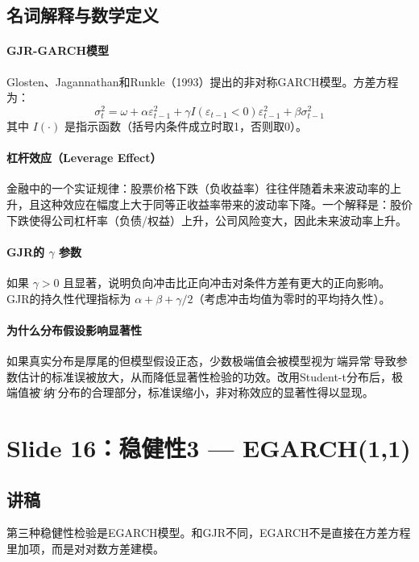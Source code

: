 \documentclass[11pt,a4paper]{article}
\begin{document}
\subsection*{名词解释与数学定义}

\paragraph{GJR-GARCH模型} Glosten、Jagannathan和Runkle（1993）提出的非对称GARCH模型。方差方程为：
\[
\sigma_t^2 = \omega + \alpha \varepsilon_{t-1}^2 + \gamma I(\varepsilon_{t-1} < 0) \varepsilon_{t-1}^2 + \beta \sigma_{t-1}^2
\]
其中 \(I(\cdot)\) 是指示函数（括号内条件成立时取1，否则取0）。

\paragraph{杠杆效应（Leverage Effect）} 金融中的一个实证规律：股票价格下跌（负收益率）往往伴随着未来波动率的上升，且这种效应在幅度上大于同等正收益率带来的波动率下降。一个解释是：股价下跌使得公司杠杆率（负债/权益）上升，公司风险变大，因此未来波动率上升。

\paragraph{GJR的 \(\gamma\) 参数} 如果 \(\gamma > 0\) 且显著，说明负向冲击比正向冲击对条件方差有更大的正向影响。GJR的持久性代理指标为 \(\alpha + \beta + \gamma/2\)（考虑冲击均值为零时的平均持久性）。

\paragraph{为什么分布假设影响显著性} 如果真实分布是厚尾的但模型假设正态，少数极端值会被模型视为\"极端异常\"，导致参数估计的标准误被放大，从而降低显著性检验的功效。改用Student-t分布后，极端值被\"接纳\"为分布的合理部分，标准误缩小，非对称效应的显著性得以显现。

\newpage
\section*{Slide 16：稳健性3 — EGARCH(1,1)}

\subsection*{讲稿}
第三种稳健性检验是EGARCH模型。和GJR不同，EGARCH不是直接在方差方程里加项，而是对对数方差建模。
\end{document}
